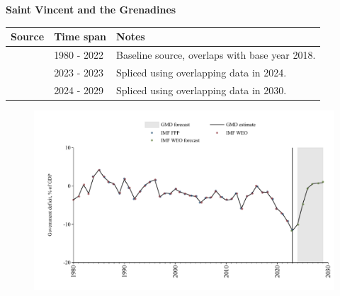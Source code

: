 \documentclass[12pt,a4paper,landscape]{article}
\begin{document}
\begin{adjustbox}{max totalsize={\paperwidth}{\paperheight},center}
\begin{minipage}[t][\textheight][t]{\textwidth}
\vspace*{0.5cm}
{}
\begin{center}
{\Large\bfseries Saint Vincent and the Grenadines}
\end{center}
\vspace{0.5cm}
\begin{table}[H]
\centering
\small
\begin{tabular}{|l|l|l|}
\hline
\textbf{Source} & \textbf{Time span} & \textbf{Notes} \\
\hline
\rowcolor{white}\cite{IMF_WEO}& 1980 - 2022 &Baseline source, overlaps with base year 2018.\\
\rowcolor{lightgray}\cite{IMF_FPP}& 2023 - 2023 &Spliced using overlapping data in 2024.\\
\rowcolor{white}\cite{IMF_WEO_forecast}& 2024 - 2029 &Spliced using overlapping data in 2030.\\
\hline
\end{tabular}
\end{table}
\begin{figure}[H]
\centering
\includegraphics[width=\textwidth,height=0.6\textheight,keepaspectratio]{graphs/VCT_govdef_GDP.pdf}
\end{figure}
\end{minipage}
\end{adjustbox}
\end{document}

